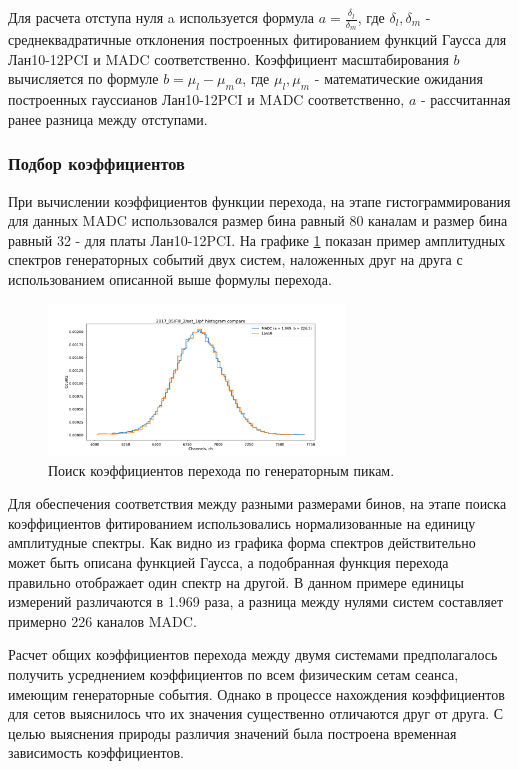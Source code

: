 \documentclass[a4paper,14pt]{extreport}
\begin{document}
Для расчета отступа нуля a используется формула $ a= \frac{\delta_l}{\delta_m} $, где $ \delta_l, \delta_m $ - среднеквадратичные отклонения построенных фитированием функций Гаусса для Лан10-12PCI и MADC соответственно. Коэффициент масштабирования $ b $ вычисляется по формуле $ b= \mu_l - \mu_m a $,  где $ \mu_l, \mu_m $ - математические ожидания построенных гауссианов Лан10-12PCI и MADC соответственно, $ a $ - рассчитанная ранее разница между отступами.

\subsubsection{Подбор коэффициентов}
При вычислении коэффициентов функции перехода, на этапе гистограммирования для данных MADC использовался размер бина равный 80 каналам и размер бина равный 32  - для платы Лан10-12PCI. На графике \ref{fig:testing-coeff-matching} показан пример амплитудных спектров генераторных событий двух систем, наложенных друг на друга с использованием описанной выше формулы перехода.

\begin{figure}
  \centering
  \includegraphics[width = 0.7\textwidth]{img/testing/coeff_matching.pdf}
    \caption{Поиск коэффициентов перехода по генераторным пикам.}
    \label{fig:testing-coeff-matching}
\end{figure}

Для обеспечения соответствия между разными размерами бинов, на этапе поиска коэффициентов фитированием использовались нормализованные на единицу амплитудные спектры. Как видно из графика форма спектров действительно может быть описана функцией Гаусса, а подобранная функция перехода правильно отображает один спектр на другой. В данном примере единицы измерений различаются в 1.969 раза, а разница между нулями систем составляет примерно 226 каналов MADC.

Расчет общих коэффициентов перехода между двумя системами предполагалось получить усреднением коэффициентов по всем физическим сетам сеанса, имеющим генераторные события. Однако в процессе нахождения коэффициентов для сетов выяснилось что их значения существенно отличаются друг от друга. С целью выяснения природы различия значений была построена временная зависимость коэффициентов. 
\end{document}
